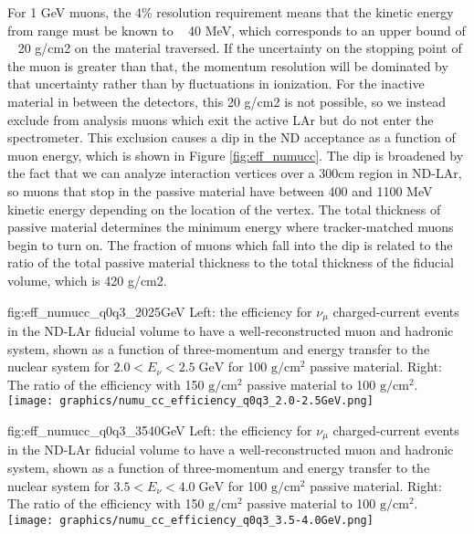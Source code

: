 For 1 GeV muons, the 4\% resolution requirement means that the kinetic energy from range must be known to ~ 40 MeV, which corresponds to an upper bound of ~ 20 g/cm2 on the material traversed. If the uncertainty on the stopping point of the muon is greater than that, the momentum resolution will be dominated by that uncertainty rather than by fluctuations in ionization. For the inactive material in between the detectors, this 20 g/cm2 is not possible, so we instead exclude from analysis muons which exit the active LAr but do not enter the spectrometer. This exclusion causes a dip in the ND acceptance as a function of muon energy, which is shown in Figure \ref{fig:eff_numucc}. The dip is broadened by the fact that we can analyze interaction vertices over a 300cm region in ND-LAr, so muons that stop in the passive material have between 400 and 1100 MeV kinetic energy depending on the location of the vertex. The total thickness of passive material determines the minimum energy where tracker-matched muons begin to turn on. The fraction of muons which fall into the dip is related to the ratio of the total passive material thickness to the total thickness of the fiducial volume, which is 420 g/cm2.

\begin{dunefigure}[Muon reconstruction efficiency vs. q0,q3,Enu=2.0-2.5 GeV]{fig:eff_numucc_q0q3_2025GeV}
{Left: the efficiency for $\nu_\mu$ charged-current events in the ND-LAr fiducial volume to have a well-reconstructed muon and hadronic system, shown as a function of three-momentum and energy transfer to the nuclear system for $2.0 < E_\nu < 2.5\;\mbox{GeV}$ for 100 $\mbox{g}/\mbox{cm}^2$ passive material. Right: The ratio of the efficiency with 150 $\mbox{g}/\mbox{cm}^2$ passive material to 100 $\mbox{g}/\mbox{cm}^2$.}
\texttt{[image: graphics/numu\_cc\_efficiency\_q0q3\_2.0-2.5GeV.png]}
\end{dunefigure}

\begin{dunefigure}[Muon reconstruction efficiency vs. q0,q3, Enu=3.5-4.0 GeV]{fig:eff_numucc_q0q3_3540GeV}
{Left: the efficiency for $\nu_\mu$ charged-current events in the ND-LAr fiducial volume to have a well-reconstructed muon and hadronic system, shown as a function of three-momentum and energy transfer to the nuclear system for $3.5 < E_\nu < 4.0\;\mbox{GeV}$ for 100 $\mbox{g}/\mbox{cm}^2$ passive material. Right: The ratio of the efficiency with 150 $\mbox{g}/\mbox{cm}^2$ passive material to 100 $\mbox{g}/\mbox{cm}^2$.}
\texttt{[image: graphics/numu\_cc\_efficiency\_q0q3\_3.5-4.0GeV.png]}
\end{dunefigure}

